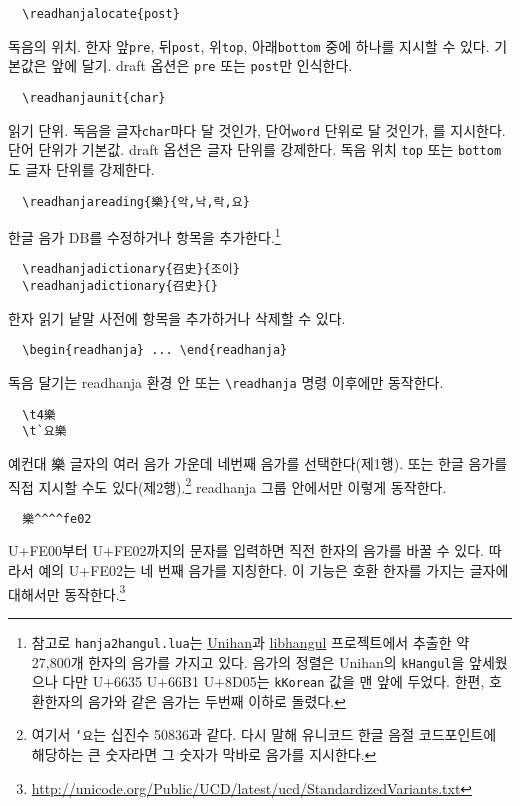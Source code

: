 \documentclass[a4paper,11pt]{article}
\begin{document}
\begin{verbatim}
  \readhanjalocate{post}
\end{verbatim}
독음의 위치. 한자 앞\verb|pre|, 뒤\verb|post|,
위\verb|top|, 아래\verb|bottom| 중에 하나를 지시할 수 있다.
기본값은 앞에 달기.
draft 옵션은 \verb|pre| 또는 \verb|post|만 인식한다.

\begin{verbatim}
  \readhanjaunit{char}
\end{verbatim}
읽기 단위. 독음을 글자\verb|char|마다 달 것인가, 단어\verb|word| 단위로
달 것인가, 를 지시한다. 단어 단위가 기본값.
draft 옵션은 글자 단위를 강제한다.
독음 위치 \verb|top| 또는 \verb|bottom|도 글자 단위를 강제한다.

\begin{verbatim}
  \readhanjareading{樂}{악,낙,락,요}
\end{verbatim}
한글 음가 DB를 수정하거나 항목을 추가한다.\footnote{참고로
  \texttt{hanja2hangul.lua}는
  \href{http://unicode.org/charts/unihan.html}{Unihan}과
  \href{https://github.com/choehwanjin/libhangul}{libhangul}
  프로젝트에서 추출한 약 27,800개 한자의 음가를
  가지고 있다. 음가의 정렬은 Unihan의 \texttt{kHangul}을 앞세웠으나
  다만 \mbox{U+6635} \mbox{U+66B1} \mbox{U+8D05}는 \texttt{kKorean} 값을
  맨 앞에 두었다. 한편, 호환한자의 음가와 같은 음가는 두번째 이하로 돌렸다.}

\begin{verbatim}
  \readhanjadictionary{召史}{조이}
  \readhanjadictionary{召史}{}
\end{verbatim}
한자 읽기 낱말 사전에 항목을 추가하거나 삭제할 수 있다.

\begin{verbatim}
  \begin{readhanja} ... \end{readhanja}
\end{verbatim}
독음 달기는 readhanja 환경 안 또는 \verb|\readhanja| 명령 이후에만 동작한다.

\begin{verbatim}
  \t4樂
  \t`요樂
\end{verbatim}
예컨대 樂 글자의 여러 음가 가운데 네번째 음가를 선택한다(제1행).
또는 한글 음가를 직접 지시할 수도 있다(제2행).\footnote{여기서 \texttt{`요}는 십진수 50836과 같다.
  다시 말해 유니코드 한글 음절 코드포인트에 해당하는 큰 숫자라면 그 숫자가 막바로 음가를 지시한다.}
readhanja 그룹 안에서만 이렇게 동작한다.

\begin{verbatim}
  樂^^^^fe02
\end{verbatim}
\mbox{U+FE00}부터 \mbox{U+FE02}까지의 문자를 입력하면 직전 한자의 음가를
바꿀 수 있다. 따라서 예의 \mbox{U+FE02}는 네 번째 음가를 지칭한다.
이 기능은 호환 한자를 가지는 글자에 대해서만 동작한다.\footnote{
\url{http://unicode.org/Public/UCD/latest/ucd/StandardizedVariants.txt}}
\end{document}
